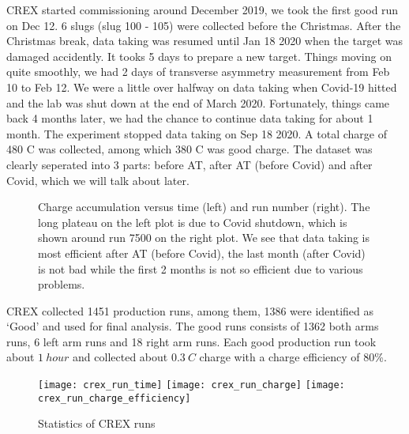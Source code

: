 CREX started commissioning around December 2019, we took the first good run on 
Dec 12. 6 slugs (slug 100 - 105) were collected before the Christmas. After 
the Christmas break, data taking was resumed until Jan 18 2020 when the \Ca 
target was damaged accidently. It tooks 5 days to prepare a new \Ca target.
Things moving on quite smoothly, we had 2 days of transverse asymmetry 
measurement from Feb 10 to Feb 12. We were a little over halfway on data taking 
when Covid-19 hitted and the lab was shut down at the end of March 2020. Fortunately,
things came back 4 months later, we had the chance to continue data taking for
about 1 month. The experiment stopped data taking on Sep 18 2020. A total charge
of 480 C was collected, among which 380 C was good charge. The dataset was clearly
seperated into 3 parts: before AT, after AT (before Covid) and after Covid, which
we will talk about later.
\begin{figure}[h!]
    \caption{Charge accumulation versus time (left) and run number (right). The
    long plateau on the left plot is due to Covid shutdown, which is shown around
    run 7500 on the right plot. We see that data taking is most efficient after
    AT (before Covid), the last month (after Covid) is not bad while the 
    first 2 months is not so efficient due to various problems.}
\end{figure}

CREX collected 1451 production runs, among them, 1386 were identified as `Good'
and used for final analysis. The good runs consists of 1362 both arms runs,
6 left arm runs and 18 right arm runs. Each good production run took about $1\ hour$
and collected about $0.3\ C$ charge with a charge efficiency of 80\%.
\begin{figure}[h!]
    \texttt{[image: crex\_run\_time]}
    \texttt{[image: crex\_run\_charge]}
    \texttt{[image: crex\_run\_charge\_efficiency]}
    \caption{Statistics of CREX runs}
\end{figure}

